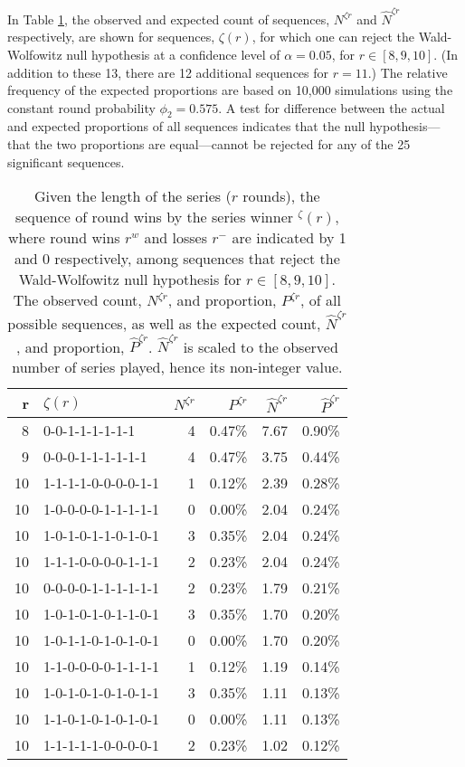 \documentclass{article}
\begin{document}
In Table \ref{tbl:cod-runs}, the observed and expected count of
sequences, \(N^{\zeta r}\) and \(\hat{N}^{\zeta r}\) respectively, are
shown for sequences, \(\zeta(r)\), for which one can reject the
Wald-Wolfowitz null hypothesis at a confidence level of
\(\alpha = 0.05\), for \(r \in [8, 9, 10]\). (In addition to these 13,
there are 12 additional sequences for \(r = 11\).) The relative
frequency of the expected proportions are based on 10,000 simulations
using the constant round probability \(\phi_2 = 0.575\). A test for
difference between the actual and expected proportions of all sequences
indicates that the null hypothesis---that the two proportions are
equal---cannot be rejected for any of the 25 significant sequences.

\begin{longtable}{rlrrrr}

\caption{Given the length of the series ($r$ rounds), the sequence of round wins by the series winner $^\zeta(r)$, where round wins $r^w$ and losses $r^-$ are indicated by 1 and 0 respectively, among sequences that reject the Wald-Wolfowitz null hypothesis for $r \in [8, 9, 10]$. The observed count, $N^{\zeta r}$, and proportion, $P^{\zeta r}$, of all possible sequences, as well as the expected count, $\hat{N}^{\zeta r}$, and proportion, $\hat{P}^{\zeta r}$. $\hat{N}^{\zeta r}$ is scaled to the observed number of series played, hence its non-integer value.}
\label{tbl:cod-runs} \\

\toprule
r & $\zeta(r)$ & $N^{\zeta r}$ & $P^{\zeta r}$ & $\hat{N}^{\zeta r}$ & $\hat{P}^{\zeta r}$ \\ 
\midrule
8 & 0-0-1-1-1-1-1-1 & 4 & 0.47\% & 7.67 & 0.90\% \\ 
9 & 0-0-0-1-1-1-1-1-1 & 4 & 0.47\% & 3.75 & 0.44\% \\ 
10 & 1-1-1-1-0-0-0-0-1-1 & 1 & 0.12\% & 2.39 & 0.28\% \\ 
10 & 1-0-0-0-0-1-1-1-1-1 & 0 & 0.00\% & 2.04 & 0.24\% \\ 
10 & 1-0-1-0-1-1-0-1-0-1 & 3 & 0.35\% & 2.04 & 0.24\% \\ 
10 & 1-1-1-0-0-0-0-1-1-1 & 2 & 0.23\% & 2.04 & 0.24\% \\ 
10 & 0-0-0-0-1-1-1-1-1-1 & 2 & 0.23\% & 1.79 & 0.21\% \\ 
10 & 1-0-1-0-1-0-1-1-0-1 & 3 & 0.35\% & 1.70 & 0.20\% \\ 
10 & 1-0-1-1-0-1-0-1-0-1 & 0 & 0.00\% & 1.70 & 0.20\% \\ 
10 & 1-1-0-0-0-0-1-1-1-1 & 1 & 0.12\% & 1.19 & 0.14\% \\ 
10 & 1-0-1-0-1-0-1-0-1-1 & 3 & 0.35\% & 1.11 & 0.13\% \\ 
10 & 1-1-0-1-0-1-0-1-0-1 & 0 & 0.00\% & 1.11 & 0.13\% \\ 
10 & 1-1-1-1-1-0-0-0-0-1 & 2 & 0.23\% & 1.02 & 0.12\% \\ 
\bottomrule
\end{longtable}
\end{document}
